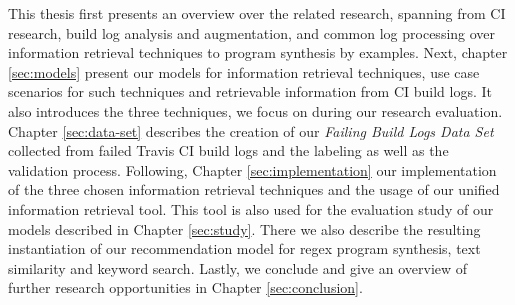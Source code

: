 \documentclass[\myrootdir/main.tex]{subfiles}
\begin{document}
This thesis first presents an overview over the related research, spanning from CI research, build log analysis and augmentation, and common  log processing over information retrieval techniques to program synthesis by examples.
Next, chapter \ref{sec:models} present our models for information retrieval techniques, use case scenarios for such techniques and retrievable information from CI build logs. It also introduces the three techniques, we focus on during our research evaluation.
Chapter \ref{sec:data-set} describes the creation of our \emph{Failing Build Logs Data Set} collected from failed Travis CI build logs and the labeling as well as the validation process.
Following, Chapter \ref{sec:implementation} our implementation of the three chosen information retrieval techniques and the usage of our unified information retrieval tool.
This tool is also used for the evaluation study of our models described in Chapter \ref{sec:study}. There we also describe the resulting instantiation of our recommendation model for regex program synthesis, text similarity and keyword search.
Lastly, we conclude and give an overview of further research opportunities in Chapter \ref{sec:conclusion}.
\end{document}
